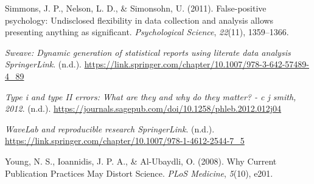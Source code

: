 \documentclass[
  british,
  a4paper,
]{article}
\newlength{\cslhangindent}
\newenvironment{CSLReferences}[2] %
 {\begin{list}{}{%
  \setlength{\itemindent}{0pt}
  \setlength{\leftmargin}{0pt}
  \setlength{\parsep}{0pt}
  \ifodd #1
   \setlength{\leftmargin}{\cslhangindent}
   \setlength{\itemindent}{-1\cslhangindent}
  \fi
  \setlength{\itemsep}{#2\baselineskip}}}
 {\end{list}}
\begin{document}
\begin{CSLReferences}{1}{0}
Simmons, J. P., Nelson, L. D., \& Simonsohn, U. (2011). False-positive
psychology: {Undisclosed} flexibility in data collection and analysis
allows presenting anything as significant. \emph{Psychological Science},
\emph{22}(11), 1359--1366.

\emph{Sweave: Dynamic generation of statistical reports using literate
data analysis \textbar{} SpringerLink}. (n.d.).
\url{https://link.springer.com/chapter/10.1007/978-3-642-57489-4_89}

\emph{Type i and type II errors: What are they and why do they matter? -
c j smith, 2012}. (n.d.).
\url{https://journals.sagepub.com/doi/10.1258/phleb.2012.012j04}

\emph{WaveLab and reproducible research \textbar{} SpringerLink}.
(n.d.).
\url{https://link.springer.com/chapter/10.1007/978-1-4612-2544-7_5}

Young, N. S., Ioannidis, J. P. A., \& Al-Ubaydli, O. (2008). Why
{Current Publication Practices May Distort Science}. \emph{PLoS
Medicine}, \emph{5}(10), e201.

\end{CSLReferences}
\end{document}
